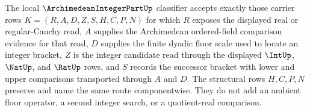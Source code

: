 \begin{definition}
\label{def:archimedean-integer-part-classifier}
The local $\ArchimedeanIntegerPartUp$ classifier accepts exactly those carrier rows $K=(R,A,D,Z,S,H,C,P,N)$ for which $R$ exposes the displayed real or regular-Cauchy read, $A$ supplies the Archimedean ordered-field comparison evidence for that read, $D$ supplies the finite dyadic floor scale used to locate an integer bracket, $Z$ is the integer candidate read through the displayed $\IntUp$, $\NatUp$, and $\RatUp$ rows, and $S$ records the successor bracket with lower and upper comparisons transported through $A$ and $D$. The structural rows $H,C,P,N$ preserve and name the same route componentwise. They do not add an ambient floor operator, a second integer search, or a quotient-real comparison.
\end{definition}

